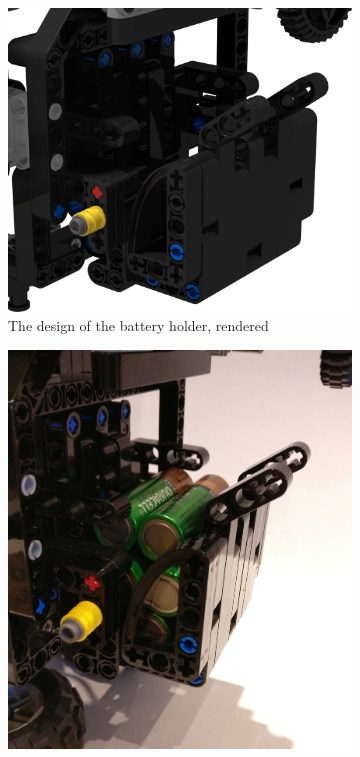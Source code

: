 \documentclass{report}
\begin{document}
	\begin{figure}[H]
		\centering
		\begin{subfigure}[b]{0.27665\textwidth}
			\includegraphics[width=\textwidth]{Resources/Images/rdrBatteryHolder.png}
			\caption{The design of the battery holder, rendered}
			\label{fig:rdrBatteryHolder}
		\end{subfigure}
		\hspace{10mm}
		\begin{subfigure}[b]{0.21082\textwidth}
			\includegraphics[width=\textwidth]{Resources/Images/imgBatteryHolder.jpg}

\end{subfigure}
\end{figure}
\end{document}
